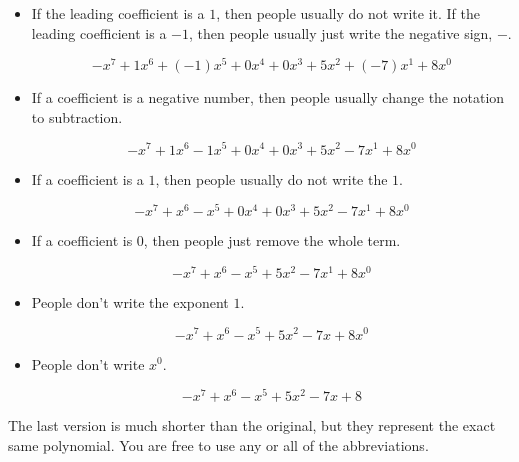 \documentclass{ximera}
\begin{document}
\begin{itemize}
\item If the leading coefficient is a $1$, then people usually do not write it. If the leading coefficient is a $-1$, then people usually just write the negative sign, $-$.


\[  -x^7 + 1 x^6 + (-1) x^5 + 0 x^4 + 0 x^3 + 5 x^2 + (-7) x^1 + 8 x^0              \]


\item If a coefficient is a negative number, then people usually change the notation to subtraction.


\[  -x^7 + 1 x^6 - 1 x^5 + 0 x^4 + 0 x^3 + 5 x^2 - 7 x^1 + 8 x^0              \]



\item If a coefficient is a $1$, then people usually do not write the $1$.


\[  -x^7 + x^6 - x^5 + 0 x^4 + 0 x^3 + 5 x^2 - 7 x^1 + 8 x^0              \]


\item If a coefficient is $0$, then people just remove the whole term.

\[  -x^7 + x^6 - x^5 + 5 x^2 - 7 x^1 + 8 x^0              \]


\item People don't write the exponent $1$.

\[  -x^7 + x^6 - x^5 + 5 x^2 - 7 x + 8 x^0              \]



\item People don't write $x^0$.

\[  -x^7 + x^6 - x^5 + 5 x^2 - 7 x + 8             \]




\end{itemize}




The last version is much shorter than the original, but they represent the exact same polynomial. You are free to use any or all of the abbreviations.
\end{document}
